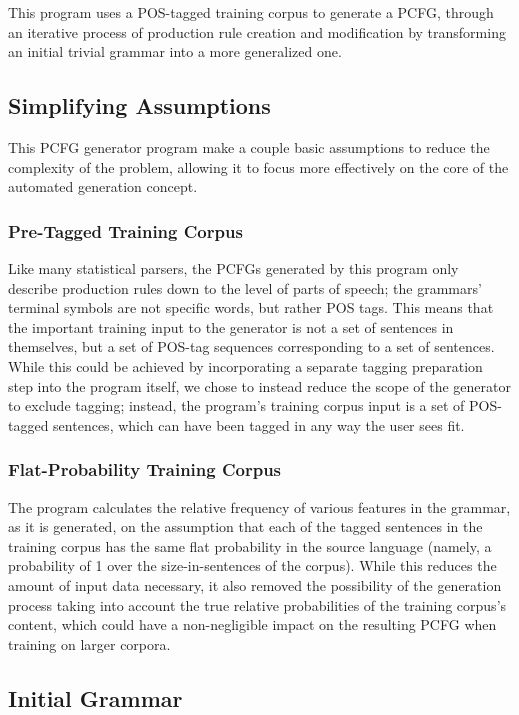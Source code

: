 \documentclass[paper=a4, fontsize=11pt]{scrartcl} %
\numberwithin{equation}{section} %
\numberwithin{figure}{section} %
\numberwithin{table}{section} %
\begin{document}
This program uses a POS-tagged training corpus to generate a PCFG, through an iterative process of production rule creation and modification by transforming an initial trivial grammar into a more generalized one.

\subsection{Simplifying Assumptions}

This PCFG generator program make a couple basic assumptions to reduce the complexity of the problem, allowing it to focus more effectively on the core of the automated generation concept.

\subsubsection{Pre-Tagged Training Corpus}

Like many statistical parsers, the PCFGs generated by this program only describe production rules down to the level of parts of speech; the grammars' terminal symbols are not specific words, but rather POS tags. This means that the important training input to the generator is not a set of sentences in themselves, but a set of POS-tag sequences corresponding to a set of sentences. While this could be achieved by incorporating a separate tagging preparation step into the program itself, we chose to instead reduce the scope of the generator to exclude tagging; instead, the program's training corpus input is a set of POS-tagged sentences, which can have been tagged in any way the user sees fit.

\subsubsection{Flat-Probability Training Corpus}

The program calculates the relative frequency of various features in the grammar, as it is generated, on the assumption that each of the tagged sentences in the training corpus has the same flat probability in the source language (namely, a probability of 1 over the size-in-sentences of the corpus). While this reduces the amount of input data necessary, it also removed the possibility of the generation process taking into account the true relative probabilities of the training corpus's content, which could have a non-negligible impact on the resulting PCFG when training on larger corpora.

\subsection{Initial Grammar}
\end{document}
